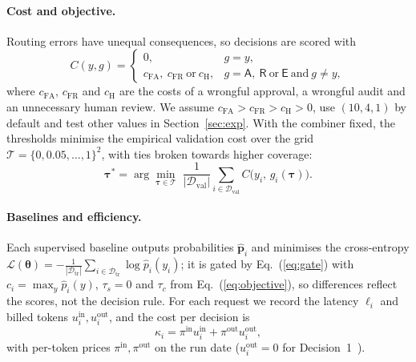 \paragraph{Cost and objective.}
Routing errors have unequal consequences, so decisions are scored with
\begin{equation}
C(y,g)=\begin{cases}
0, & g=y,\\
c_{\mathrm{FA}},\ c_{\mathrm{FR}}\ \text{or}\ c_{\mathrm{H}}, & g=\mathsf{A},\ \mathsf{R}\ \text{or}\ \mathsf{E}\ \text{and}\ g\neq y,
\end{cases} \label{eq:cost}
\end{equation}
where $c_{\mathrm{FA}}$, $c_{\mathrm{FR}}$ and $c_{\mathrm{H}}$ are the costs of a wrongful approval, a wrongful audit and an unnecessary human review. We assume $c_{\mathrm{FA}}>c_{\mathrm{FR}}>c_{\mathrm{H}}>0$, use $(10,4,1)$ by default and test other values in Section~\ref{sec:exp}. With the combiner fixed, the thresholds minimise the empirical validation cost over the grid $\mathcal{T}=\{0,0.05,\dots,1\}^2$, with ties broken towards higher coverage:
\begin{equation}
\boldsymbol{\tau}^{*}=\arg\min_{\boldsymbol{\tau}\in\mathcal{T}}\;\frac{1}{|\mathcal{D}_{\mathrm{val}}|}\sum_{i\in\mathcal{D}_{\mathrm{val}}} C\big(y_i,\,g_i(\boldsymbol{\tau})\big). \label{eq:objective}
\end{equation}

\paragraph{Baselines and efficiency.}
Each supervised baseline outputs probabilities $\hat{\mathbf{p}}_i$ and minimises the cross-entropy $\mathcal{L}(\boldsymbol{\theta})=-\frac{1}{|\mathcal{D}_{\mathrm{tr}}|}\sum_{i\in\mathcal{D}_{\mathrm{tr}}}\log \hat{p}_i(y_i)$; it is gated by Eq.~(\ref{eq:gate}) with $c_i=\max_y\hat{p}_i(y)$, $\tau_s=0$ and $\tau_c$ from Eq.~(\ref{eq:objective}), so differences reflect the scores, not the decision rule. For each request we record the latency $\ell_i$ and billed tokens $u_i^{\mathrm{in}},u_i^{\mathrm{out}}$, and the cost per decision is
\begin{equation}
\kappa_i=\pi^{\mathrm{in}}u_i^{\mathrm{in}}+\pi^{\mathrm{out}}u_i^{\mathrm{out}}, \label{eq:apicost}
\end{equation}
with per-token prices $\pi^{\mathrm{in}},\pi^{\mathrm{out}}$ on the run date ($u_i^{\mathrm{out}}=0$ for Decision~1~\cite{google2026decisions}).

